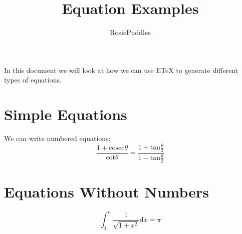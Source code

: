 \documentclass{article}
\title{Equation Examples}
\date{}
\author{RosiePuddles}
\begin{document}
\maketitle
In this document we will look at how we can use ETeX to generate different types of equations.\\
\section{Simple Equations}
We can write numbered equations:\\
\begin{equation}
\frac{1+\mathrm{cosec}\theta}{\mathrm{cot}\theta}=\frac{1+\mathrm{tan}\frac\theta 2}{1-\mathrm{tan}\frac\theta 2}
\end{equation}
\section{Equations Without Numbers}
\begin{equation*}
\int_{0}^{n}\frac{1}{\sqrt{1+x^2}}\mathrm{d}x=\pi
\end{equation*}
\end{document}
